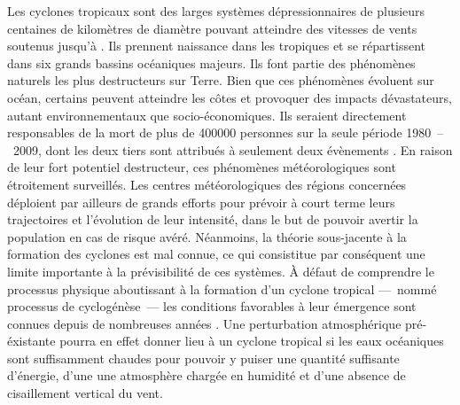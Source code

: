 \documentclass[../main.tex]{subfiles}
\begin{document}
Les cyclones tropicaux sont des larges systèmes dépressionnaires de plusieurs centaines de kilomètres de diamètre pouvant atteindre des vitesses de vents
soutenus jusqu'à . Ils prennent naissance dans les tropiques et se répartissent dans six grands bassins océaniques majeurs. Ils font partie des
phénomènes naturels les plus destructeurs sur Terre. Bien que ces phénomènes évoluent sur océan, certains peuvent atteindre les côtes et provoquer des impacts
dévastateurs, autant environnementaux que socio-économiques. Ils seraient directement responsables de la mort de plus de \num{400000} personnes sur la seule
période \num{1980}~--~\num{2009}, dont les deux tiers sont attribués à seulement deux évènements \parencite{doocy_human_2013}. En raison de leur fort potentiel
destructeur, ces phénomènes météorologiques sont étroitement surveillés. Les centres météorologiques des régions concernées déploient par ailleurs de grands
efforts pour prévoir à court terme leurs trajectoires et l'évolution de leur intensité, dans le but de pouvoir avertir la population en cas de risque avéré.
Néanmoins, la théorie sous-jacente à la formation des cyclones est mal connue, ce qui consistitue par conséquent une limite importante à la prévisibilité de ces
systèmes. À défaut de comprendre le processus physique aboutissant à la formation d'un cyclone tropical ---~nommé processus de cyclogénèse~--- les conditions
favorables à leur émergence sont connues depuis de nombreuses années \parencite{gray_tropical_1975}. Une perturbation atmosphérique pré-éxistante pourra en
effet donner lieu à un cyclone tropical si les eaux océaniques sont suffisamment chaudes pour pouvoir y puiser une quantité suffisante d'énergie, d'une une
atmosphère chargée en humidité et d'une absence de cisaillement vertical du vent.
\end{document}
